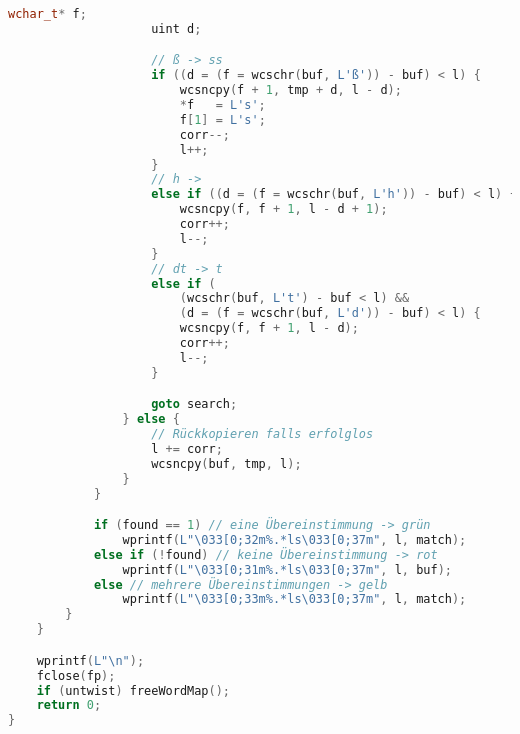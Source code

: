 \documentclass[a4paper,10pt,ngerman]{scrartcl}
\begin{document}
\begin{lstlisting}[language=C++]
                    wchar_t* f;
                    uint d;

                    // ß -> ss
                    if ((d = (f = wcschr(buf, L'ß')) - buf) < l) {
                        wcsncpy(f + 1, tmp + d, l - d);
                        *f   = L's';
                        f[1] = L's';
                        corr--;
                        l++;
                    }
                    // h ->
                    else if ((d = (f = wcschr(buf, L'h')) - buf) < l) {
                        wcsncpy(f, f + 1, l - d + 1);
                        corr++;
                        l--;
                    }
                    // dt -> t
                    else if (
                        (wcschr(buf, L't') - buf < l) &&
                        (d = (f = wcschr(buf, L'd')) - buf) < l) {
                        wcsncpy(f, f + 1, l - d);
                        corr++;
                        l--;
                    }

                    goto search;
                } else {
                    // Rückkopieren falls erfolglos
                    l += corr;
                    wcsncpy(buf, tmp, l);
                }
            }

            if (found == 1) // eine Übereinstimmung -> grün
                wprintf(L"\033[0;32m%.*ls\033[0;37m", l, match);
            else if (!found) // keine Übereinstimmung -> rot
                wprintf(L"\033[0;31m%.*ls\033[0;37m", l, buf);
            else // mehrere Übereinstimmungen -> gelb
                wprintf(L"\033[0;33m%.*ls\033[0;37m", l, match);
        }
    }

    wprintf(L"\n");
    fclose(fp);
    if (untwist) freeWordMap();
    return 0;
}


\end{lstlisting}
\end{document}
